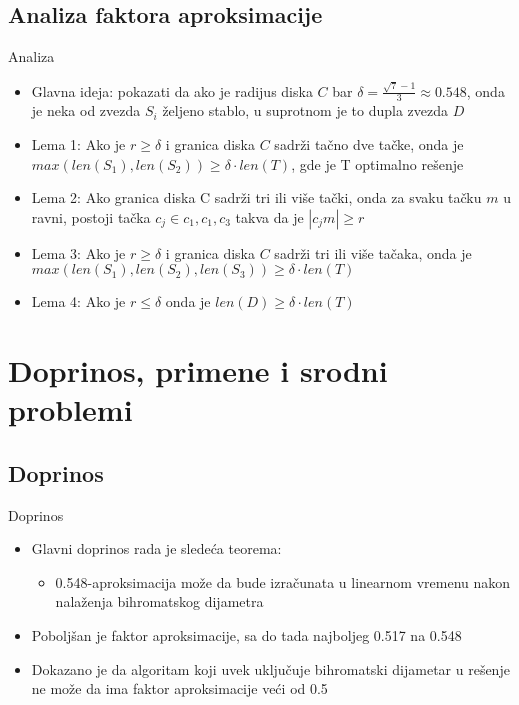 \documentclass[hyperref={bookmarks=false}]{beamer}
\begin{document}
\subsection{Analiza faktora aproksimacije}
\begin{frame}{Analiza}
\begin{itemize}
    \item Glavna ideja: pokazati da ako je radijus diska $C$ bar $\delta = \frac{\sqrt{7}-1}{3} \approx 0.548$, onda je neka od zvezda $S_i$ željeno stablo, u suprotnom je to dupla zvezda $D$
    \item Lema 1: Ako je $r \ge \delta$ i granica diska $C$ sadrži tačno dve tačke, onda je $max(len(S_1), len(S_2)) \ge \delta \cdot len(T)$, gde je T optimalno rešenje
    \item Lema 2: Ako granica diska C sadrži tri ili više tački, onda za svaku tačku $m$ u ravni, postoji tačka $c_j \in {c_1, c_1, c_3}$ takva da je $|c_jm| \ge r$
    \item Lema 3: Ako je $r \ge \delta$ i granica diska $C$ sadrži tri ili više tačaka, onda je $max(len(S_1), len(S_2), len(S_3)) \ge \delta \cdot len(T)$
    \item Lema 4: Ako je $r \leq \delta$ onda je $len(D) \ge \delta \cdot len(T)$
\end{itemize}
\end{frame}

\section{Doprinos, primene i srodni problemi}
\subsection{Doprinos}
\begin{frame}{Doprinos}
\begin{itemize}
    \item Glavni doprinos rada je sledeća teorema:
    \begin{itemize}
        \item 0.548-aproksimacija može da bude izračunata u linearnom vremenu nakon nalaženja bihromatskog dijametra
    \end{itemize}
    \item Poboljšan je faktor aproksimacije, sa do tada najboljeg 0.517 na 0.548
    \item Dokazano je da algoritam koji uvek uključuje bihromatski dijametar u rešenje ne može da ima faktor aproksimacije veći od 0.5
\end{itemize}
\end{frame}
\end{document}
